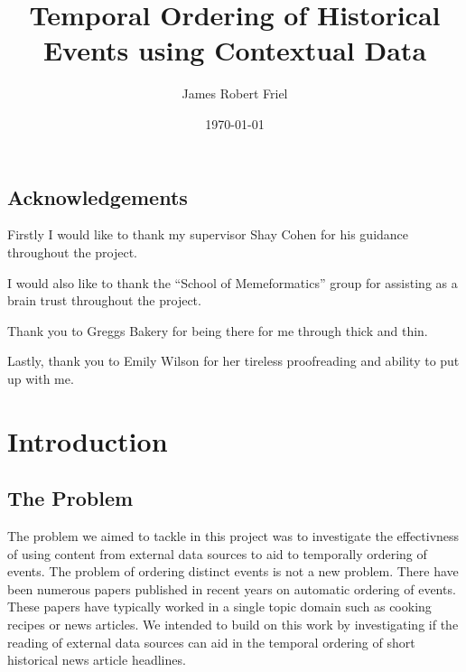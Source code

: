 \documentclass[bsc,frontabs,twoside,singlespacing,parskip,deptreport]{infthesis}     %
\begin{document}
\title{Temporal Ordering of Historical Events using Contextual Data}

\author{James Robert Friel}
 

\date{\today}



\maketitle

\section*{Acknowledgements}
Firstly I would like to thank my supervisor Shay Cohen for his guidance throughout the project.

I would also like to thank the ``School of Memeformatics'' group for assisting as a brain trust
throughout the project.

Thank you to Greggs Bakery for being there for me through thick and thin.

Lastly, thank you to Emily Wilson for her tireless proofreading and ability to put up with me.

\tableofcontents



\chapter{Introduction}
\section{The Problem}
The problem we aimed to tackle in this project was to investigate the effectivness of using content from
external data sources to aid to temporally ordering of events.
The problem of ordering distinct events is not a new problem. There have been numerous papers published
in recent years on automatic ordering of events. These papers have typically worked in a single
topic domain such as cooking recipes or news articles. We intended to build on this work by
investigating if the reading of external data sources can aid in the temporal ordering of short
historical news article headlines.
\end{document}
